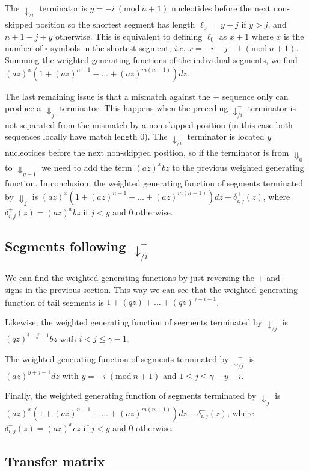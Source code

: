 \documentclass{article}
\newcommand{\modulo}[1]{\ (\mathrm{mod}\ #1)}
\begin{document}
The $\downarrow_{/i}^-$ terminator is $y = -i \modulo{n+1}$ nucleotides
before the next non-skipped position so the shortest segment has length
$\ell_0 = y-j$ if $y > j$, and $n+1-j+y$ otherwise. This is equivalent to
defining $\ell_0$ as $x+1$ where $x$ is the number of $\square$ symbols in
the shortest segment, \textit{i.e.} $x=-i-j-1 \modulo{n+1}$. Summing the
weighted generating functions of the individual segments, we find
$(az)^x(1+(az)^{n+1} + \ldots + (az)^{m(n+1)})dz$.

The last remaining issue is that a mismatch against the $+$ sequence only
can produce a $\Downarrow_j$ terminator. This happens when the preceding
$\downarrow_{/i}^-$ terminator is not separated from the mismatch by a
non-skipped position (in this case both sequences locally have match
length 0). The $\downarrow_{/i}^-$ terminator is located $y$ nucleotides
before the next non-skipped position, so if the terminator is from
$\Downarrow_0$ to $\Downarrow_{y-1}$ we need to add the term
$(az)^xbz$ to the previous weighted generating function. In
conclusion, the weighted generating function of segments terminated by
$\Downarrow_j$ is $(az)^x(1+(az)^{n+1} + \ldots + (az)^{m(n+1)})dz +
\delta^+_{i,j}(z)$, where $\delta^+_{i,j}(z) = (az)^xbz$ if $j < y$ and
$0$ otherwise.


\subsection{Segments following $\downarrow_{/i}^+$}

We can find the weighted generating functions by just reversing the $+$
and $-$ signs in the previous section. This way we can see that the
weighted generating function of tail segments is $1 + (qz) + \ldots +
(qz)^{\gamma-i-1}$.

Likewise, the weighted generating function of segments terminated by
$\downarrow_{/j}^+$ is $(qz)^{i-j-1}bz$ with $i < j \leq \gamma-1$.

The weighted generating function of segments terminated by
$\downarrow_{/j}^-$ is $(az)^{y+j-1}dz$ with $y = -i \modulo{n+1}$ and $1
\leq j \leq \gamma-y-i$.

Finally, the weighted generating function of segments terminated by
$\Downarrow_j$ is $(az)^x(1+(az)^{n+1} + \ldots + (az)^{m(n+1)})dz +
\delta^-_{i,j}(z)$, where $\delta^-_{i,j}(z) = (az)^xcz$ if $j < y$ and
$0$ otherwise.


\subsection{Transfer matrix}
\end{document}

